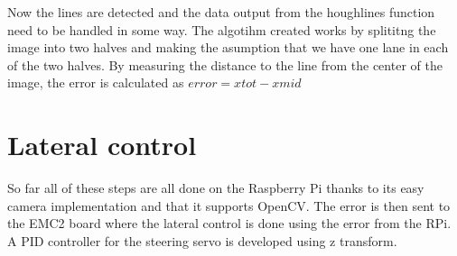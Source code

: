 Now the lines are detected and the data  output from the houghlines function need to be handled in some way. 
The algotihm created works by splititng the image into two halves and making the asumption that we have one lane in each of the two halves. By measuring the distance to the line from the center of the image, the error is calculated as $error = xtot - xmid$





\section{Lateral control}
So far all of these steps are all done on the Raspberry Pi thanks to its easy camera implementation and that it supports OpenCV. The error is then sent to the EMC2 board where the lateral control is done using the error from the RPi. A PID controller for the steering servo is developed using z transform.

